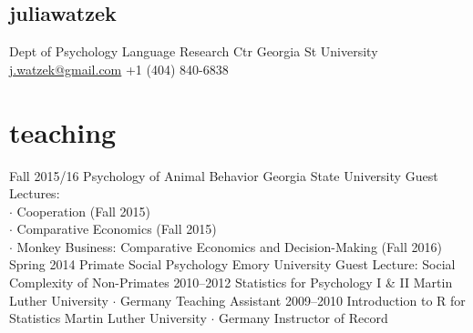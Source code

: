 \documentclass[]{friggeri-cv}
\begin{document}
\begin{aside}
  \section{{\normalfont julia}watzek}
    Dept of Psychology
    Language Research Ctr
    Georgia St University
    ~
    \href{mailto:j.watzek@gmail.com}{j.watzek@gmail.com}
    +1 (404) 840-6838
\end{aside}



\section{teaching}

\begin{entrylist}
  \entry
    {Fall 2015/16}
    {Psychology of Animal Behavior}
    {Georgia State University}
    {Guest Lectures:\\ 
    $\cdot$ Cooperation (Fall 2015)\\
    $\cdot$ Comparative Economics (Fall 2015)\\
    $\cdot$ Monkey Business: Comparative Economics and Decision-Making (Fall 2016)}
  \entry
    {Spring 2014}
    {Primate Social Psychology}
    {Emory University}
    {Guest Lecture: Social Complexity of Non-Primates}
  \entry
    {2010--2012}
    {Statistics for Psychology I \& II}
    {Martin Luther University $\cdot$ Germany}
    {Teaching Assistant}
  \entry
    {2009--2010}
    {Introduction to R for Statistics}
    {Martin Luther University $\cdot$ Germany}
    {Instructor of Record}
\end{entrylist}



\end{document}
